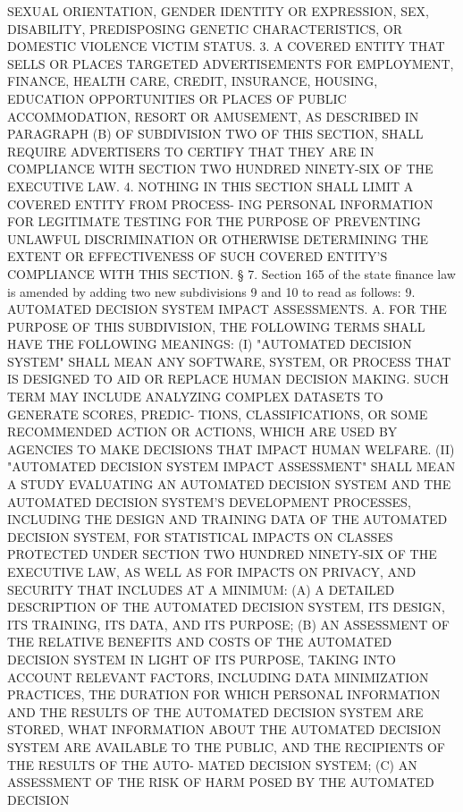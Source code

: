  SEXUAL  ORIENTATION,  GENDER  IDENTITY  OR  EXPRESSION, SEX, DISABILITY,
 PREDISPOSING  GENETIC  CHARACTERISTICS,  OR  DOMESTIC  VIOLENCE   VICTIM
 STATUS.
   3.  A  COVERED ENTITY THAT SELLS OR PLACES TARGETED ADVERTISEMENTS FOR
 EMPLOYMENT, FINANCE, HEALTH CARE, CREDIT, INSURANCE, HOUSING,  EDUCATION
 OPPORTUNITIES OR PLACES OF PUBLIC ACCOMMODATION, RESORT OR AMUSEMENT, AS
 DESCRIBED  IN  PARAGRAPH  (B)  OF SUBDIVISION TWO OF THIS SECTION, SHALL
 REQUIRE ADVERTISERS TO CERTIFY THAT THEY ARE IN COMPLIANCE WITH  SECTION
 TWO HUNDRED NINETY-SIX OF THE EXECUTIVE LAW.
   4.  NOTHING IN THIS SECTION SHALL LIMIT A COVERED ENTITY FROM PROCESS-
 ING PERSONAL INFORMATION FOR  LEGITIMATE  TESTING  FOR  THE  PURPOSE  OF
 PREVENTING  UNLAWFUL  DISCRIMINATION OR OTHERWISE DETERMINING THE EXTENT
 OR EFFECTIVENESS OF SUCH COVERED ENTITY'S COMPLIANCE WITH THIS SECTION.
   § 7. Section 165 of the state finance law is amended by adding two new
 subdivisions 9 and 10 to read as follows:
   9. AUTOMATED DECISION SYSTEM IMPACT ASSESSMENTS.
   A. FOR THE PURPOSE OF THIS SUBDIVISION, THE FOLLOWING TERMS SHALL HAVE
 THE FOLLOWING MEANINGS:
   (I) "AUTOMATED DECISION SYSTEM" SHALL MEAN ANY  SOFTWARE,  SYSTEM,  OR
 PROCESS  THAT  IS DESIGNED TO AID OR REPLACE HUMAN DECISION MAKING. SUCH
 TERM MAY INCLUDE ANALYZING COMPLEX DATASETS TO GENERATE SCORES,  PREDIC-
 TIONS, CLASSIFICATIONS, OR SOME RECOMMENDED ACTION OR ACTIONS, WHICH ARE
 USED BY AGENCIES TO MAKE DECISIONS THAT IMPACT HUMAN WELFARE.
   (II)  "AUTOMATED DECISION SYSTEM IMPACT ASSESSMENT" SHALL MEAN A STUDY
 EVALUATING AN AUTOMATED  DECISION  SYSTEM  AND  THE  AUTOMATED  DECISION
 SYSTEM'S  DEVELOPMENT  PROCESSES, INCLUDING THE DESIGN AND TRAINING DATA
 OF THE AUTOMATED DECISION SYSTEM, FOR  STATISTICAL  IMPACTS  ON  CLASSES
 PROTECTED  UNDER SECTION TWO HUNDRED NINETY-SIX OF THE EXECUTIVE LAW, AS
 WELL AS FOR IMPACTS ON PRIVACY, AND SECURITY THAT INCLUDES AT A MINIMUM:
   (A) A DETAILED DESCRIPTION  OF  THE  AUTOMATED  DECISION  SYSTEM,  ITS
 DESIGN, ITS TRAINING, ITS DATA, AND ITS PURPOSE;
   (B)  AN ASSESSMENT OF THE RELATIVE BENEFITS AND COSTS OF THE AUTOMATED
 DECISION SYSTEM IN LIGHT OF ITS PURPOSE, TAKING  INTO  ACCOUNT  RELEVANT
 FACTORS,  INCLUDING  DATA MINIMIZATION PRACTICES, THE DURATION FOR WHICH
 PERSONAL INFORMATION AND THE RESULTS OF THE  AUTOMATED  DECISION  SYSTEM
 ARE  STORED,  WHAT  INFORMATION  ABOUT THE AUTOMATED DECISION SYSTEM ARE
 AVAILABLE TO THE PUBLIC, AND THE RECIPIENTS OF THE RESULTS OF THE  AUTO-
 MATED DECISION SYSTEM;
   (C)  AN ASSESSMENT OF THE RISK OF HARM POSED BY THE AUTOMATED DECISION
